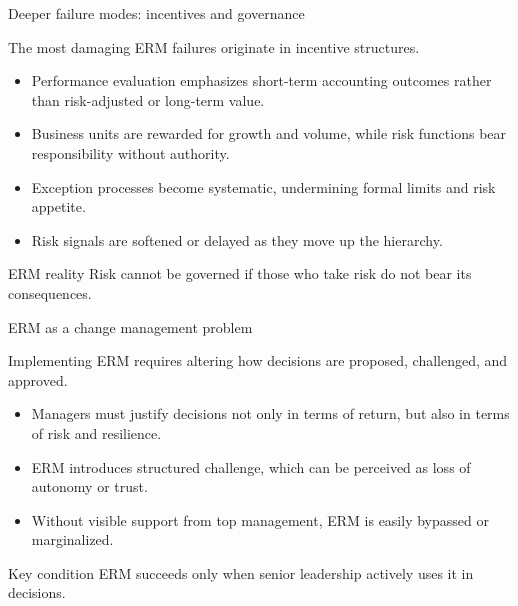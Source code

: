 \documentclass[aspectratio=169, 10pt]{beamer} %
\begin{document}
\begin{frame}{Deeper failure modes: incentives and governance}

The most damaging ERM failures originate in incentive structures.

\medskip

\begin{itemize}
  \item[$\bullet$] Performance evaluation emphasizes short-term accounting
  outcomes rather than risk-adjusted or long-term value.

  \item[$\bullet$] Business units are rewarded for growth and volume, while
  risk functions bear responsibility without authority.

  \item[$\bullet$] Exception processes become systematic, undermining formal
  limits and risk appetite.

  \item[$\bullet$] Risk signals are softened or delayed as they move up the
  hierarchy.
\end{itemize}

\begin{block}{ERM reality}
Risk cannot be governed if those who take risk do not bear its consequences.
\end{block}

\end{frame}

\begin{frame}{ERM as a change management problem}

Implementing ERM requires altering how decisions are proposed, challenged,
and approved.

\medskip

\begin{itemize}
  \item[$\bullet$] Managers must justify decisions not only in terms of return,
  but also in terms of risk and resilience.

  \item[$\bullet$] ERM introduces structured challenge, which can be perceived
  as loss of autonomy or trust.

  \item[$\bullet$] Without visible support from top management, ERM is easily
  bypassed or marginalized.
\end{itemize}

\begin{block}{Key condition}
ERM succeeds only when senior leadership actively uses it in decisions.
\end{block}

\end{frame}
\end{document}
